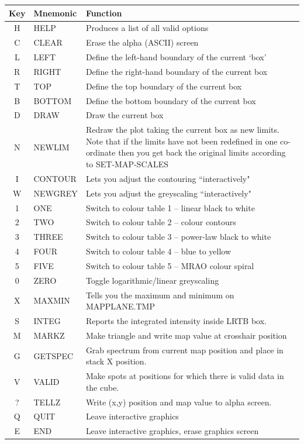 \documentclass[11pt,twoside]{report}
\begin{document}
\begin{table}[htbp]
\begin{center}
\begin{tabular}{|c|l|l|} \hline
Key & Mnemonic & Function \\ \hline
H &HELP &Produces a list of all valid options\\
C &CLEAR &Erase the alpha (ASCII) screen\\
L &LEFT &Define the left-hand boundary of the current `box'\\
R &RIGHT &Define the right-hand boundary of the current box\\
T &TOP &Define the top boundary of the current box\\
B &BOTTOM &Define the bottom boundary of the current box\\
D &DRAW &Draw the current box\\
N & NEWLIM & \parbox[t]{3.7in}{ Redraw the plot taking the current box as new 
                      limits. Note that if the limits have not been
                      redefined in one co-ordinate then you get back the
                      original limits according to SET-MAP-SCALES} \\
I & CONTOUR & Lets you adjust the contouring ``interactively"\\
W & NEWGREY & Lets you adjust the greyscaling ``interactively"\\
1 & ONE     & Switch to colour table 1 -- linear black to white\\
2 & TWO     & Switch to colour table 2 -- colour contours\\
3 & THREE   & Switch to colour table 3 -- power-law black to white\\
4 & FOUR    & Switch to colour table 4 -- blue to yellow\\
5 & FIVE    & Switch to colour table 5 -- MRAO colour spiral\\
0 & ZERO    & Toggle logarithmic/linear greyscaling\\
X & MAXMIN & Tells you the maximum and minimum on MAPPLANE.TMP\\
S & INTEG & Reports the integrated intensity inside LRTB box.\\
M & MARKZ & Make triangle and write map value at crosshair position\\
G & GETSPEC & \parbox[t]{3.7in}{Grab spectrum from current map position and place in
                      stack X position.}\\
V & VALID & \parbox[t]{3.7in}{Make spots at positions for which there is valid
                    data in the cube.}\\
? & TELLZ & Write (x,y) position and map value to alpha screen.\\
Q & QUIT & Leave interactive graphics\\
E &END &Leave interactive graphics, erase graphics screen\\ \hline
\end{tabular}
\end{center}
\end{table}
\end{document}
